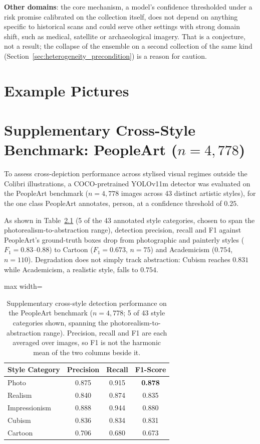 \documentclass[12pt,a4paper]{report}
\begin{document}
\textbf{Other domains}: the core mechanism, a model's confidence thresholded under a risk promise calibrated on the collection itself, does not depend on anything specific to historical scans and could serve other settings with strong domain shift, such as medical, satellite or archaeological imagery. That is a conjecture, not a result; the collapse of the ensemble on a second collection of the same kind (Section~\ref{sec:heterogeneity_precondition}) is a reason for caution.

\appendix
\chapter{Example Pictures}
\label{app:example_pictures}


\chapter{Supplementary Cross-Style Benchmark: PeopleArt (\texorpdfstring{$n=4{,}778$}{n = 4,778})}
\label{app:peopleart}
To assess cross-depiction performance across stylised visual regimes outside the Colibri illustrations, a COCO-pretrained YOLOv11m detector was evaluated on the PeopleArt benchmark \cite{westlake2016} ($n=4{,}778$ images across 43 distinct artistic styles), for the one class PeopleArt annotates, person, at a confidence threshold of $0.25$. 

As shown in Table~\ref{tab:peopleart_summary} (5 of the 43 annotated style categories, chosen to span the photorealism-to-abstraction range), detection precision, recall and F1 against PeopleArt's ground-truth boxes drop from photographic and painterly styles ($F_1 = 0.83$--$0.88$) to Cartoon ($F_1 = 0.673$, $n=75$) and Academicism ($0.754$, $n=110$). Degradation does not simply track abstraction: Cubism reaches $0.831$ while Academicism, a realistic style, falls to $0.754$.

\begin{table}[!htbp]
\centering
\caption[Person detection on PeopleArt, by style]{Supplementary cross-style detection performance on the PeopleArt benchmark ($n=4{,}778$; 5 of 43 style categories shown, spanning the photorealism-to-abstraction range). Precision, recall and F1 are each averaged over images, so F1 is not the harmonic mean of the two columns beside it.}
\label{tab:peopleart_summary}
\begin{adjustbox}{max width=\linewidth}
\begin{tabular}{lccc}
\toprule
\textbf{Style Category} & \textbf{Precision} & \textbf{Recall} & \textbf{F1-Score} \\
\midrule
Photo & 0.875 & 0.915 & \textbf{0.878} \\
Realism & 0.840 & 0.874 & 0.835 \\
Impressionism & 0.888 & 0.944 & 0.880 \\
Cubism & 0.836 & 0.834 & 0.831 \\
Cartoon & 0.706 & 0.680 & 0.673 \\
\bottomrule
\end{tabular}
\end{adjustbox}
\end{table}
\end{document}
